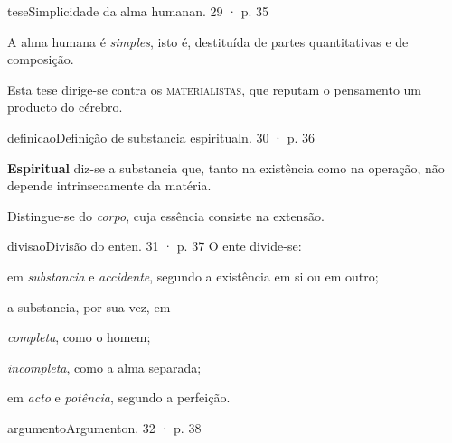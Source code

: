 \documentclass[aspectratio=169,11pt]{beamer}
\begin{document}


\begin{slide}{tese}{Simplicidade da alma humana}{n. 29 · p. 35}
\begin{enunciado}
A alma humana é \textit{simples}, isto é, destituída de partes quantitativas e de composição.
\end{enunciado}

Esta tese dirige-se contra os \textsc{materialistas}, que reputam o pensamento um producto do cérebro.
\end{slide}

\begin{slide}{definicao}{Definição de substancia espiritual}{n. 30 · p. 36}
\begin{enunciado}
\textbf{Espiritual} diz-se a substancia que, tanto na existência como na operação, não depende intrinsecamente da matéria.
\end{enunciado}
Distingue-se do \textit{corpo}, cuja essência consiste na extensão.
\end{slide}

\begin{slide}{divisao}{Divisão do ente}{n. 31 · p. 37}
O ente divide-se:
\begin{topicos}
\item em \textit{substancia} e \textit{accidente}, segundo a existência em si ou em outro;
\item a substancia, por sua vez, em
  \begin{topicos}
  \item \textit{completa}, como o homem;
  \item \textit{incompleta}, como a alma separada;
  \end{topicos}
\item em \textit{acto} e \textit{potência}, segundo a perfeição.
\end{topicos}
\end{slide}

\begin{slide}{argumento}{Argumento}{n. 32 · p. 38}
\begin{rotulados}
\end{rotulados}
\end{slide}
\end{document}
